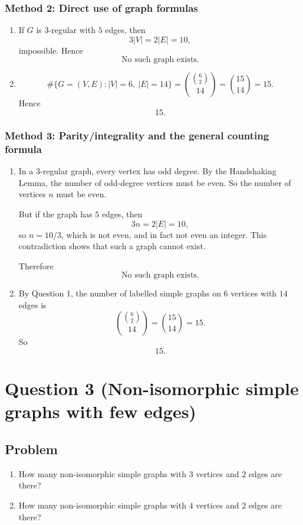 \documentclass[12pt]{article}
\begin{document}
\subsubsection{Method 2: Direct use of graph formulas}
\begin{enumerate}[label=(\alph*)]
\item
If \(G\) is \(3\)-regular with \(5\) edges, then
\[
3|V|=2|E|=10,
\]
impossible. Hence
\[
\boxed{\text{No such graph exists.}}
\]

\item
\[
\#\{G=(V,E):|V|=6,\ |E|=14\}
=
\binom{\binom{6}{2}}{14}
=
\binom{15}{14}
=
15.
\]
Hence
\[
\boxed{15.}
\]
\end{enumerate}
\subsubsection{Method 3: Parity/integrality and the general counting formula}
\begin{enumerate}[label=(\alph*)]
\item In a \(3\)-regular graph, every vertex has odd degree. By the Handshaking Lemma, the number of odd-degree vertices must be even. So the number of vertices \(n\) must be even.

But if the graph has \(5\) edges, then
\[
3n=2|E|=10,
\]
so \(n=10/3\), which is not even, and in fact not even an integer. This contradiction shows that such a graph cannot exist.

Therefore
\[
\boxed{\text{No such graph exists.}}
\]

\item By Question 1, the number of labelled simple graphs on \(6\) vertices with \(14\) edges is
\[
\binom{\binom{6}{2}}{14}=\binom{15}{14}=15.
\]
So
\[
\boxed{15.}
\]
\end{enumerate}

\newpage
\section{Question 3 (Non-isomorphic simple graphs with few edges)}

\subsection{Problem}
\begin{enumerate}[label=(\alph*)]
\item How many non-isomorphic simple graphs with \(3\) vertices and \(2\) edges are there?
\item How many non-isomorphic simple graphs with \(4\) vertices and \(2\) edges are there?
\end{enumerate}
\end{document}
